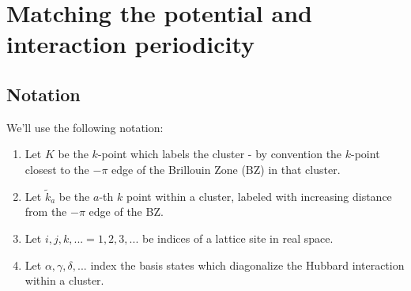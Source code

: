 \documentclass[12pt]{article}
\numberwithin{equation}{section}
\begin{document}
\section{Matching the potential and interaction periodicity}
\subsection{Notation}
We'll use the following notation:
\begin{enumerate}
    \item Let $K$ be the $k$-point which labels the cluster - by convention the $k$-point closest to the $-\pi$ edge of the Brillouin Zone (BZ) in that cluster.
    \item Let $\tilde{k}_a$ be the $a$-th $k$ point within a cluster, labeled with increasing distance from the $-\pi$ edge of the BZ.
    \item Let $i,j,k,...=1,2,3,...$ be indices of a lattice site in real space.
    \item Let $\alpha,\gamma,\delta,...$ index the basis states which diagonalize the Hubbard interaction within a cluster.
\end{enumerate}
\end{document}
